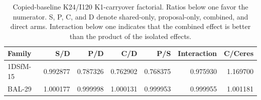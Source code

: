 \begin{table}[t]
  \centering
  \caption{Copied-baseline K24/I120 K1-carryover factorial. Ratios below one favor the numerator. S, P, C, and D denote shared-only, proposal-only, combined, and direct arms. Interaction below one indicates that the combined effect is better than the product of the isolated effects.}
  \label{tab:k1-carryover-k24-factorial}
  \scriptsize
  \begin{tabular}{lrrrrrr}
    \hline
    Family & S/D & P/D & C/D & P/S & Interaction & C/Ceres \\
    \hline
    1DSfM-15 & 0.992877 & 0.787326 & 0.762902 & 0.768375 & 0.975930 & 1.169700 \\
    BAL-29 & 1.000177 & 0.999998 & 1.000131 & 0.999953 & 0.999955 & 1.001181 \\
    \hline
  \end{tabular}
\end{table}
